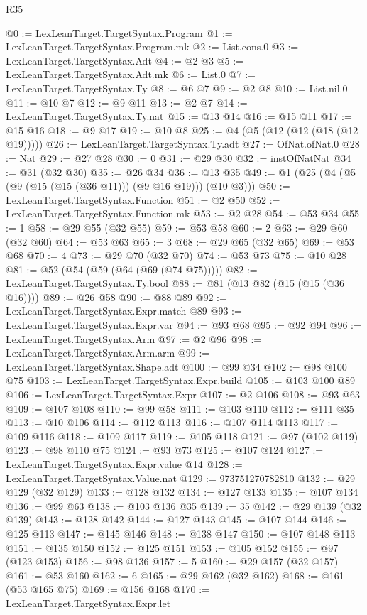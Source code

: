 \begin{lexlean}{R35}
\begin{coremodule}
@0 := LexLeanTarget.TargetSyntax.Program
@1 := LexLeanTarget.TargetSyntax.Program.mk
@2 := List.cons.{0}
@3 := LexLeanTarget.TargetSyntax.Adt
@4 := @2 @3
@5 := LexLeanTarget.TargetSyntax.Adt.mk
@6 := List.{0}
@7 := LexLeanTarget.TargetSyntax.Ty
@8 := @6 @7
@9 := @2 @8
@10 := List.nil.{0}
@11 := @10 @7
@12 := @9 @11
@13 := @2 @7
@14 := LexLeanTarget.TargetSyntax.Ty.nat
@15 := @13 @14
@16 := @15 @11
@17 := @15 @16
@18 := @9 @17
@19 := @10 @8
@25 := @4 (@5 (@12 (@12 (@18 (@12 @19)))))
@26 := LexLeanTarget.TargetSyntax.Ty.adt
@27 := OfNat.ofNat.{0}
@28 := Nat
@29 := @27 @28
@30 := 0
@31 := @29 @30
@32 := instOfNatNat
@34 := @31 (@32 @30)
@35 := @26 @34
@36 := @13 @35
@49 := @1 (@25 (@4 (@5 (@9 (@15 (@15 (@36 @11))) (@9 @16 @19))) (@10 @3)))
@50 := LexLeanTarget.TargetSyntax.Function
@51 := @2 @50
@52 := LexLeanTarget.TargetSyntax.Function.mk
@53 := @2 @28
@54 := @53 @34
@55 := 1
@58 := @29 @55 (@32 @55)
@59 := @53 @58
@60 := 2
@63 := @29 @60 (@32 @60)
@64 := @53 @63
@65 := 3
@68 := @29 @65 (@32 @65)
@69 := @53 @68
@70 := 4
@73 := @29 @70 (@32 @70)
@74 := @53 @73
@75 := @10 @28
@81 := @52 (@54 (@59 (@64 (@69 (@74 @75)))))
@82 := LexLeanTarget.TargetSyntax.Ty.bool
@88 := @81 (@13 @82 (@15 (@15 (@36 @16))))
@89 := @26 @58
@90 := @88 @89
@92 := LexLeanTarget.TargetSyntax.Expr.match @89
@93 := LexLeanTarget.TargetSyntax.Expr.var
@94 := @93 @68
@95 := @92 @94
@96 := LexLeanTarget.TargetSyntax.Arm
@97 := @2 @96
@98 := LexLeanTarget.TargetSyntax.Arm.arm
@99 := LexLeanTarget.TargetSyntax.Shape.adt
@100 := @99 @34
@102 := @98 @100 @75
@103 := LexLeanTarget.TargetSyntax.Expr.build
@105 := @103 @100 @89
@106 := LexLeanTarget.TargetSyntax.Expr
@107 := @2 @106
@108 := @93 @63
@109 := @107 @108
@110 := @99 @58
@111 := @103 @110
@112 := @111 @35
@113 := @10 @106
@114 := @112 @113
@116 := @107 @114 @113
@117 := @109 @116
@118 := @109 @117
@119 := @105 @118
@121 := @97 (@102 @119)
@123 := @98 @110 @75
@124 := @93 @73
@125 := @107 @124
@127 := LexLeanTarget.TargetSyntax.Expr.value @14
@128 := LexLeanTarget.TargetSyntax.Value.nat
@129 := 973751270782810
@132 := @29 @129 (@32 @129)
@133 := @128 @132
@134 := @127 @133
@135 := @107 @134
@136 := @99 @63
@138 := @103 @136 @35
@139 := 35
@142 := @29 @139 (@32 @139)
@143 := @128 @142
@144 := @127 @143
@145 := @107 @144
@146 := @125 @113
@147 := @145 @146
@148 := @138 @147
@150 := @107 @148 @113
@151 := @135 @150
@152 := @125 @151
@153 := @105 @152
@155 := @97 (@123 @153)
@156 := @98 @136
@157 := 5
@160 := @29 @157 (@32 @157)
@161 := @53 @160
@162 := 6
@165 := @29 @162 (@32 @162)
@168 := @161 (@53 @165 @75)
@169 := @156 @168
@170 := LexLeanTarget.TargetSyntax.Expr.let

\end{coremodule}
\end{lexlean}
